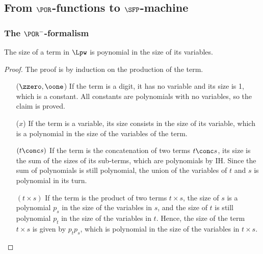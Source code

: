 \subsection{From $\POR$-functions
to $\SFP$-machine}\label{app:sec:PORtoSFP}





\subsubsection{The $\POR^-$-formalism}

\begin{lemma}\label{lemma:size}
The size of a term in $\Lpw$ is poynomial in the size
of its variables.
\end{lemma}
\begin{proof}
The proof is by induction on the production of the term.
\begin{itemize}
%
\item[($\zzero,\oone$)] If the term is a digit, it has no variable and its size is
{1}, which is a constant.
All constants are polynomials with no variables, so the claim is proved.
%
\item[($x$)] If the term is a variable, its size consists in the size of
its variable, which is a polynomial in the size of the variables of the term.
%
\item[$(t\conc s)$] If the term is the concatenation
of two terms $t\conc s$, its size is the sum of the sizes of
its sub-terms, which are polynomials by IH.
{Since the sum of polynomials is still polynomial, the union
of the variables of $t$ and $s$ is polynomial in its turn.}
%
\item[$(t\times s)$] If the term is the product of two terms
$t\times s$, the size of $s$ is a polynomial $p_s$ in
the size of the variables in $s$, and the size of
$t$ is still polynomial $p_t$ in the size of
the variables in $t$.
Hence, the size of the term $t\times s$
is given by $p_tp_s$, which is polynomial
in the size of the variables in $t\times s$.
\end{itemize}
\end{proof}


